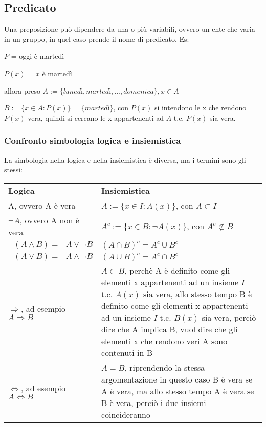\documentclass[a4paper,12pt]{article}
\begin{document}
	\subsection{Predicato}
	Una preposizione può dipendere da una o più variabili, ovvero un ente che varia in un gruppo, in quel caso prende il nome di predicato. 
	Es: 
	
	$P$ = oggi è martedì
	
	$P(x)$ = $x$ è martedì 
	
	allora preso $A := \{lunedì, martedì, ... , domenica\}, x \in A$
	
	$B := \{x\in A : P(x)\}$ = $\{martedì\}$, con $P(x)$ si intendono le x che rendono $P(x)$ vera, quindi si cercano le x appartenenti ad $A$ t.c. $P(x)$ sia vera.
	
	\subsubsection{Confronto simbologia logica e insiemistica}
	La simbologia nella logica e nella insiemistica è diversa, ma i termini sono gli stessi: \newline
	\begin{center}
		\begin{tabular}{p{} p{}}
			\textbf{Logica} &
			\textbf{Insiemistica} \\
			A, ovvero A è vera &
			$A := \{x \in I : A(x)\}$, con $A \subset I$ \\
			$\neg A$, ovvero A non è vera &
			$A^c := \{x \in B : \neg A(x)\}$, con $A^c \not\subset B$ \\
			$\neg (A \wedge B) = \neg A \vee \neg B$ &
			$(A \cap B)^c = A^c \cup B^c$ \\
			$\neg (A \vee B) = \neg A \wedge \neg B$ &
			$(A \cup B)^c = A^c \cap B^c$ \\
			$\Rightarrow$, ad esempio $A \Rightarrow B$ &
			$A \subset B$, perchè A è definito come gli elementi x appartenenti ad un insieme $I$ t.c. $A(x)$ sia vera, allo stesso tempo B è definito come gli elementi x appartenenti ad un insieme $I$ t.c. $B(x)$ sia vera, perciò dire che A implica B, vuol dire che gli elementi x che rendono veri A sono contenuti in B \\
			$\iff$, ad esempio $A \iff B$ & $A = B$, riprendendo la stessa argomentazione in questo caso B è vera se A è vera, ma allo stesso tempo A è vera se B è vera, perciò i due insiemi coincideranno
		\end{tabular}
	\end{center}
	
\end{document}
